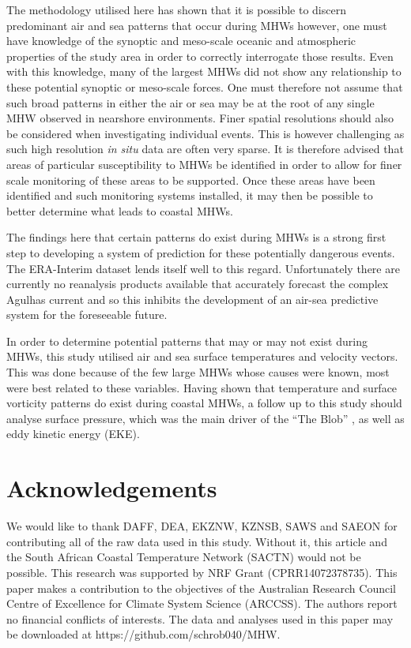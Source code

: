 \documentclass[a4paper,10pt,review]{elsarticle}
\begin{document}
The methodology utilised here has shown that it is possible to discern predominant air and sea patterns that occur during MHWs however, one must have knowledge of the synoptic and meso-scale oceanic and atmospheric properties of the study area in order to correctly interrogate those results. Even with this knowledge, many of the largest MHWs did not show any relationship to these potential synoptic or meso-scale forces. One must therefore not assume that such broad patterns in either the air or sea may be at the root of any single MHW observed in nearshore environments. Finer spatial resolutions should also be considered when investigating individual events. This is however challenging as such high resolution \emph{in situ} data are often very sparse. It is therefore advised that areas of particular susceptibility to MHWs be identified in order to allow for finer scale monitoring of these areas to be supported. Once these areas have been identified and such monitoring systems installed, it may then be possible to better determine what leads to coastal MHWs. 

The findings here that certain patterns do exist during MHWs is a strong first step to developing a system of prediction for these potentially dangerous events. The ERA-Interim dataset lends itself well to this regard. Unfortunately there are currently no reanalysis products available that accurately forecast the complex Agulhas current and so this inhibits the development of an air-sea predictive system for the foreseeable future.

In order to determine potential patterns that may or may not exist during MHWs, this study utilised air and sea surface temperatures and velocity vectors. This was done because of the few large MHWs whose causes were known, \citep[e.g.][]{Garrabou2009, Feng2013, Pearce2013, Benthuysen2014, Chen2015a, Oliver2017} most were best related to these variables. Having shown that temperature and surface vorticity patterns do exist during coastal MHWs, a follow up to this study should analyse surface pressure, which was the main driver of the ``The Blob'' \citep{Bond2015a}, as well as eddy kinetic energy (EKE).

\section*{Acknowledgements}
We would like to thank DAFF, DEA, EKZNW, KZNSB, SAWS and SAEON for contributing all of the raw data used in this study. Without it, this article and the South African Coastal Temperature Network (SACTN) would not be possible. This research was supported by NRF Grant (CPRR14072378735). This paper makes a contribution to the objectives of the Australian Research Council Centre of Excellence for Climate System Science (ARCCSS). The authors report no financial conflicts of interests. The data and analyses used in this paper may be downloaded at https://github.com/schrob040/MHW. 
\end{document}

